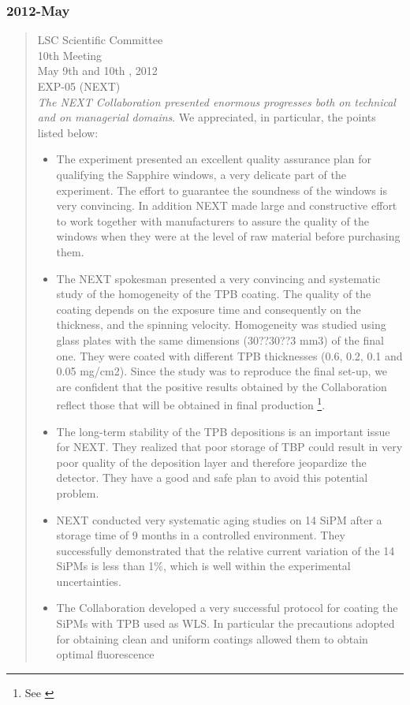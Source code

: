 \subsubsection*{2012-May}
\begin{quotation}
LSC Scientific Committee \\
10th Meeting\\
May 9th and 10th , 2012\\
EXP-05 (NEXT)\\

{\em The NEXT Collaboration presented enormous progresses both on technical and on managerial domains}. We appreciated, in particular, the points listed below:
\begin{itemize}
\item The experiment presented an excellent quality assurance plan for qualifying the Sapphire windows, a very delicate part of the experiment. The effort to guarantee the soundness of the windows is very convincing. In addition NEXT made large and constructive effort to work together with manufacturers to assure the quality of the windows when they were at the level of raw material before purchasing them.
\item The NEXT spokesman presented a very convincing and systematic study of the homogeneity of the TPB coating. The quality of the coating depends on the exposure time and consequently on the thickness, and the spinning velocity. Homogeneity was studied using glass plates with the same dimensions (30??30??3 mm3) of the final one. They were coated with different TPB thicknesses (0.6, 0.2, 0.1 and 0.05 mg/cm2). Since the study was to reproduce the final set-up, we are confident that the positive results obtained by the Collaboration reflect those that will be obtained in final production \footnote{See  \cite{Alvarez:2012ub}}.
\item The long-term stability of the TPB depositions is an important issue for NEXT. They realized that poor storage of TBP could result in very poor quality of the deposition layer and therefore jeopardize the detector. They have a good and safe plan to avoid this potential problem.
\item NEXT conducted very systematic aging studies on 14 SiPM after a storage time of 9 months in a controlled environment. They successfully demonstrated that the relative current variation of the 14 SiPMs is less than 1\%, which is well within the experimental uncertainties. 
\item The Collaboration developed a very successful protocol for coating the SiPMs with TPB used as WLS. In particular the precautions adopted for obtaining clean and uniform coatings allowed them to obtain optimal fluorescence 

\end{itemize}
\end{quotation}
